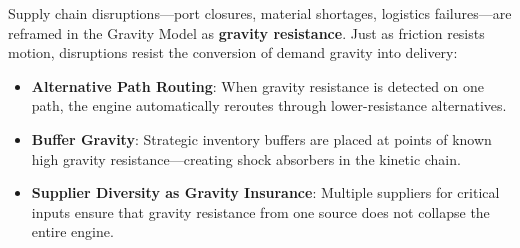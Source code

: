 \documentclass[11pt,a4paper,twocolumn]{article}
\begin{document}
Supply chain disruptions---port closures, material shortages, logistics failures---are reframed in the Gravity Model as \textbf{gravity resistance}. Just as friction resists motion, disruptions resist the conversion of demand gravity into delivery:

\begin{itemize}[leftmargin=1.5em]
  \item \textbf{Alternative Path Routing}: When gravity resistance is detected on one path, the engine automatically reroutes through lower-resistance alternatives.
  \item \textbf{Buffer Gravity}: Strategic inventory buffers are placed at points of known high gravity resistance---creating shock absorbers in the kinetic chain.
  \item \textbf{Supplier Diversity as Gravity Insurance}: Multiple suppliers for critical inputs ensure that gravity resistance from one source does not collapse the entire engine.
\end{itemize}
\end{document}
